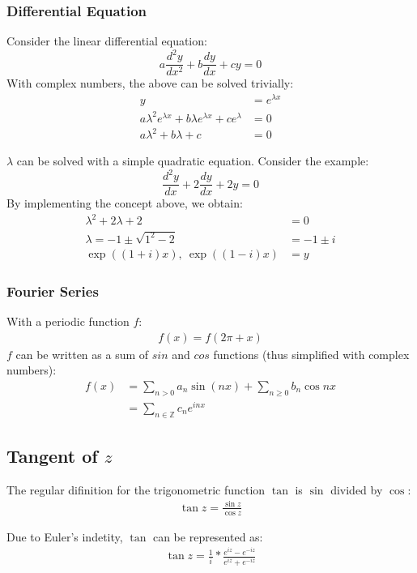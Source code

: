 \documentclass[12pt]{article}
\begin{document}
	\subsubsection{Differential Equation}
	
	Consider the linear differential equation: $$a\frac{d^2y}{dx^2} + b\frac{dy}{dx} + cy = 0$$
	With complex numbers, the above can be solved trivially:
	\begin{align*}
		y &= e^{\lambda x} \\
		a\lambda^2e^{\lambda x} + b\lambda e^{\lambda x} + ce^\lambda &= 0 \\
		a \lambda^2 + b\lambda + c &= 0
	\end{align*}
	
	$\lambda$ can be solved with a simple quadratic equation. Consider the example: $$\frac{d^2 y}{dx} + 2\frac{dy}{dx} + 2y = 0$$
	By implementing the concept above, we obtain:
	\begin{align*}
		\lambda^2 + 2\lambda + 2 &= 0 \\
		\lambda = -1 \pm \sqrt{1^2 - 2} &= -1 \pm i \\
		\exp((1 + i)x),\ \exp((1 - i)x) &= y
	\end{align*}
	
	\subsubsection{Fourier Series}
	
	With a periodic function $f$: 
	\begin{gather*}
		f(x) = f(2\pi + x)
	\end{gather*}
	$f$ can be written as a sum of $sin$ and $cos$ functions (thus simplified with complex numbers):
	\begin{align*}
		f(x) &= \sum_{n > 0} a_n \sin(nx) + \sum_{n \geq 0} b_n \cos{nx} \\
		&= \sum_{n \in \mathbb{Z}} c_n e^{inx}
	\end{align*}
	
	\subsection{Tangent of $z$}
	
	The regular difinition for the trigonometric function $\tan$ is $\sin$ divided by $\cos$:
	\begin{gather*}
		\tan z = \frac{\sin z}{\cos z}
	\end{gather*}
	
	Due to Euler's indetity, $\tan$ can be represented as:
	\begin{gather*}
		\tan z = \frac{1}{i} * \frac{e^{iz} - e^{-iz}}{e^{iz} + e^{-iz}}
	\end{gather*}
	
\end{document}
